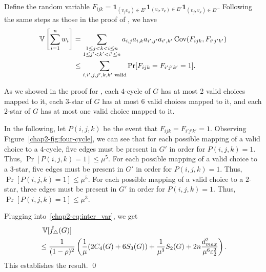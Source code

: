 {Define the random variable $F_{ijk} = \textbf{1}_{(v_j v_k) \in E'}
\textbf{1}_{(v_i, v_k) \in E'} \allowbreak \textbf{1}_{(v_j, v_k) \in E'}$. Following the same
steps as those in the proof of \AlgTwo{}, we have
\begin{align*}
  \operatorname{\mathbb{V}}\left[\sum_{i=1}^n w_i\right]
  &= \sum_{\substack{1 \leq j < k < i \leq n \\ 1 \leq j' < k' <
  i' \leq n}} a_{i,j} a_{i,k} a_{i',j'} a_{i',k'} \operatorname{\text{Cov}}(F_{ijk}, F_{i'j'k'}) \\
  &\leq
  \sum_{i,i',j,j',k,k'\text{ valid}} \Pr[F_{ijk} = F_{i'j'k'} = 1].
\end{align*}

As we showed in the proof for \AlgTwo{}, each $4$-cycle of $G$ has at most
2 valid choices mapped to it, each $3$-star of $G$ has at most 6 valid
choices mapped to it, and each $2$-star of $G$ has at most one valid choice
mapped to it.

In the following, let $P(i,j,k)$ be the event that $F_{ijk} = F_{i'j'k'} = 1$.
Observing Figure~\ref{chap2-fig:four-cycle}, we can see that for each possible
mapping of a valid choice to a $4$-cycle, five edges must be present in $G'$ in
order for $P(i,j,k) = 1$. Thus, $\Pr[P(i,j,k) = 1] \leq \mu^5$. For each possible
mapping of a valid choice to a $3$-star, five edges must be present in $G'$ in
order for $P(i,j,k) = 1$. Thus, $\Pr[P(i,j,k) = 1] \leq \mu^5$. For each possible
mapping of a valid choice to a $2$-star, three edges must be present in $G'$ in
order for $P(i,j,k) = 1$. Thus, $\Pr[P(i,j,k) = 1] \leq \mu^3$.

Plugging into~\eqref{chap2-eq:inter_var}, we get
\begin{align*}
  &\;\operatorname{\mathbb{V}}[\hat{f}_\triangle(G)] \\
  &\leq \frac{1}{(1-\rho)^2} \left(\frac{1}{\mu}(2C_4(G) + 6S_3(G)) + \frac{1}{\mu^3} S_2(G) + 2n\frac{d_{max}^2}{\mu^6\varepsilon_2^2}\right).
\end{align*}
This establishes the result.
\qed

}
